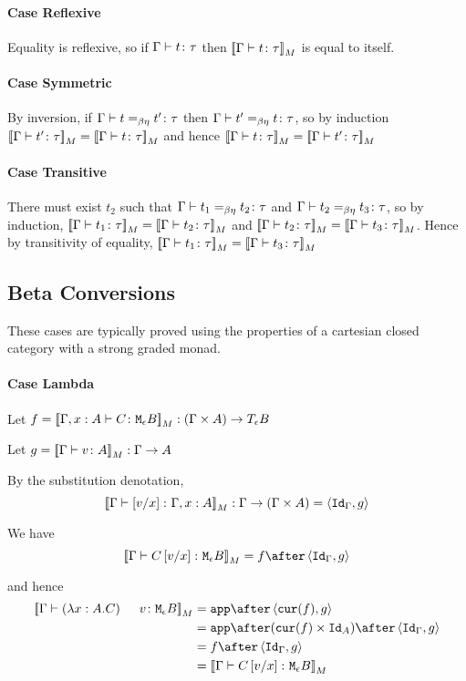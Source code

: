 {    \paragraph{Case Reflexive}
    Equality is reflexive, so if $\gtyperelation{t}{\tau}$ then $\deno{\gtyperelation{t}{\tau}}$ is equal to itself.
    \paragraph{Case Symmetric}
    By inversion, if $\gberelation{t}{t'}{\tau}$ then $\gberelation{t'}{t}{\tau}$, so by induction $\gdenoequality{t'}{t}{\tau}$ and hence $\gdenoequality{t}{t'}{\tau}$
    \paragraph{Case Transitive}
    There must exist $t_2$ such that $\gberelation{t_1}{t_2}{\tau}$ and $\gberelation{t_2}{t_3}{\tau}$, so by induction,
    $\gdenoequality{t_1}{t_2}{\tau}$ and $\gdenoequality{t_2}{t_3}{\tau}$. Hence by transitivity of equality, $\gdenoequality{t_1}{t_3}{\tau}$

    \subsection{Beta Conversions}
    These cases are typically proved using the properties of a cartesian closed category with a strong graded monad.

    \paragraph{Case Lambda}
        Let $f = \deno{\typerelation{\gax}{C}{\meb}}: (\G \times A) \rightarrow\teb$

        Let $g = \deno{\gtyperelation{v}{A}}: \G \rightarrow A$

        By the substitution denotation, $$\deno{\typerelation{\G}{\ssub{x}{v}}{\gax}}: \G \rightarrow (\G \times A) = \pr{\idg}{g}$$

        We have $$\deno{\gtyperelation{C\ssub{x}{v}}{\meb}} = f \after \pr{\idg}{g}$$

        and hence
        \begin{equation}
            \begin{split}
                \deno{\gtyperelation{\apply{(\lam{x}{A}{C})}{v}}{\meb}} & = \app\after\pr{\cur{f}}{g} \\
                & = \app\after(\cur{f}\times\Id{A})\after\pr{\idg}{g}\\
                & = f \after \pr{\idg}{g} \\
                & = \deno{\gtyperelation{C\ssub{x}{v}}{\meb}}  
            \end{split}
        \end{equation}
       

}
